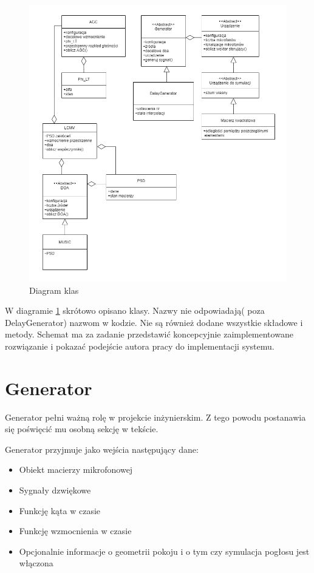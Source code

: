 \begin{figure}[h!]
    \centering
    \includegraphics[width=\textwidth]{Images/uml_pl.png}
    \caption{Diagram klas}
    \label{fig:classes}
\end{figure}


\noindent W diagramie \ref{fig:classes} skrótowo opisano klasy. Nazwy nie odpowiadają( poza DelayGenerator) nazwom w kodzie. Nie są również dodane wszystkie składowe i metody. Schemat ma za zadanie przedstawić koncepcyjnie zaimplementowane rozwiązanie i pokazać podejście autora pracy do implementacji systemu.


\newpage

\section{Generator}

Generator pełni ważną rolę w projekcie inżynierskim. Z tego powodu postanawia się poświęcić mu osobną sekcję w tekście. 

\noindent Generator przyjmuje jako wejścia następujący dane:

\begin{itemize}
    \item Obiekt macierzy mikrofonowej
    \item Sygnały dzwiękowe 
    \item Funkcję kąta w czasie
    \item Funkcję wzmocnienia w czasie
    \item Opcjonalnie informacje o geometrii pokoju i o tym czy symulacja pogłosu jest włączona
\end{itemize}

